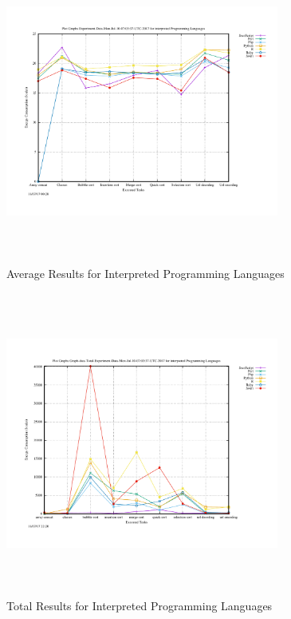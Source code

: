 \begin{figure}
	\centering
	\includegraphics[width=9cm,height=10cm,keepaspectratio]{"Graph_Experiment-Data-Mon-Jul-10-07:03:37-UTC-2017_interpreted"}
	\caption{Average Results for Interpreted Programming Languages}
	\label{Interpreted}
\end{figure}

\begin{figure}
	\centering
	\includegraphics[width=9cm,height=10cm,keepaspectratio]{"Graph_Graph-data-Total-Experiment-Data-Mon-Jul-10-07:03:37-UTC-2017_interpreted"}
	\caption{Total Results for Interpreted Programming Languages}
	\label{Interpreted Total}
\end{figure}

